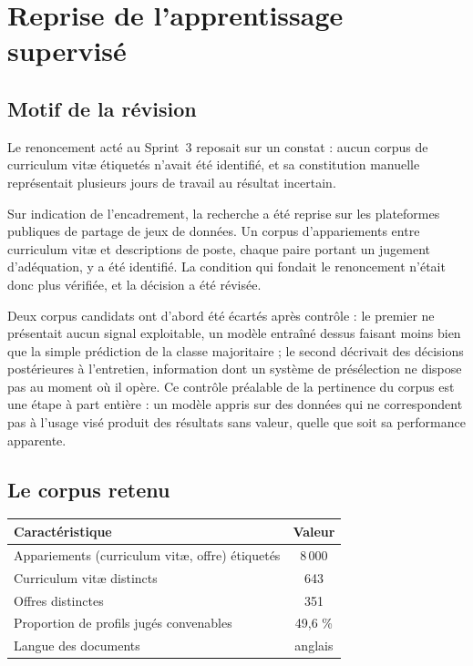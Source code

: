 \documentclass[11pt,a4paper]{article}
\begin{document}
\section{Reprise de l'apprentissage supervisé}\label{sec:revision}

\subsection{Motif de la révision}
Le renoncement acté au Sprint~3 reposait sur un constat : aucun corpus de curriculum vitæ étiquetés n'avait été identifié, et sa constitution manuelle représentait plusieurs jours de travail au résultat incertain.

Sur indication de l'encadrement, la recherche a été reprise sur les plateformes publiques de partage de jeux de données. Un corpus d'appariements entre curriculum vitæ et descriptions de poste, chaque paire portant un jugement d'adéquation, y a été identifié. La condition qui fondait le renoncement n'était donc plus vérifiée, et la décision a été révisée.

Deux corpus candidats ont d'abord été écartés après contrôle : le premier ne présentait aucun signal exploitable, un modèle entraîné dessus faisant moins bien que la simple prédiction de la classe majoritaire ; le second décrivait des décisions postérieures à l'entretien, information dont un système de présélection ne dispose pas au moment où il opère. Ce contrôle préalable de la pertinence du corpus est une étape à part entière : un modèle appris sur des données qui ne correspondent pas à l'usage visé produit des résultats sans valeur, quelle que soit sa performance apparente.

\subsection{Le corpus retenu}

\begin{center}
\small
\begin{tabular}{lc}
  \toprule
  \textbf{Caractéristique} & \textbf{Valeur} \\
  \midrule
  Appariements (curriculum vitæ, offre) étiquetés & 8\,000 \\
  Curriculum vitæ distincts & 643 \\
  Offres distinctes & 351 \\
  Proportion de profils jugés convenables & 49,6 \% \\
  Langue des documents & anglais \\
  \bottomrule
\end{tabular}
\end{center}
\end{document}
